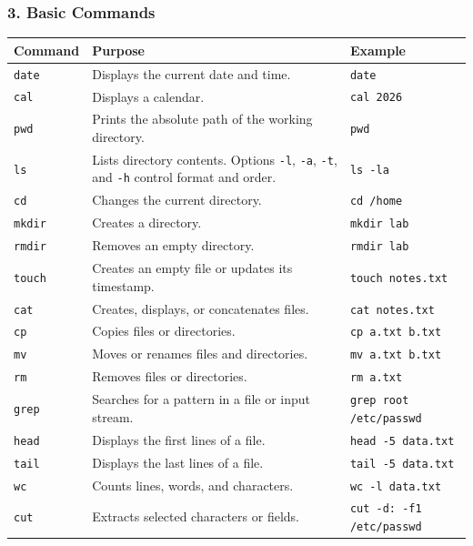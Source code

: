 \subsubsection*{3. Basic Commands}
\begingroup
\setlength{\tabcolsep}{5pt}
\begin{longtable}{|p{3.0cm}|p{7.9cm}|p{3.5cm}|}
\hline
\textbf{Command} & \textbf{Purpose} & \textbf{Example} \\ \hline
\endhead
\texttt{date} & Displays the current date and time. & \texttt{date} \\ \hline
\texttt{cal} & Displays a calendar. & \texttt{cal 2026} \\ \hline
\texttt{pwd} & Prints the absolute path of the working directory. & \texttt{pwd} \\ \hline
\texttt{ls} & Lists directory contents. Options \texttt{-l}, \texttt{-a}, \texttt{-t}, and \texttt{-h} control format and order. & \texttt{ls -la} \\ \hline
\texttt{cd} & Changes the current directory. & \texttt{cd /home} \\ \hline
\texttt{mkdir} & Creates a directory. & \texttt{mkdir lab} \\ \hline
\texttt{rmdir} & Removes an empty directory. & \texttt{rmdir lab} \\ \hline
\texttt{touch} & Creates an empty file or updates its timestamp. & \texttt{touch notes.txt} \\ \hline
\texttt{cat} & Creates, displays, or concatenates files. & \texttt{cat notes.txt} \\ \hline
\texttt{cp} & Copies files or directories. & \texttt{cp a.txt b.txt} \\ \hline
\texttt{mv} & Moves or renames files and directories. & \texttt{mv a.txt b.txt} \\ \hline
\texttt{rm} & Removes files or directories. & \texttt{rm a.txt} \\ \hline
\texttt{grep} & Searches for a pattern in a file or input stream. & \texttt{grep root /etc/passwd} \\ \hline
\texttt{head} & Displays the first lines of a file. & \texttt{head -5 data.txt} \\ \hline
\texttt{tail} & Displays the last lines of a file. & \texttt{tail -5 data.txt} \\ \hline
\texttt{wc} & Counts lines, words, and characters. & \texttt{wc -l data.txt} \\ \hline
\texttt{cut} & Extracts selected characters or fields. & \texttt{cut -d: -f1 /etc/passwd} \\ \hline

\end{longtable}
